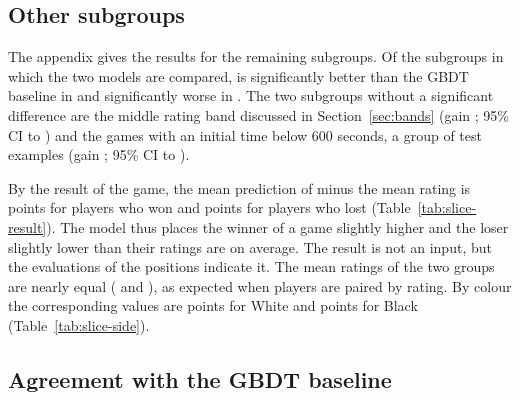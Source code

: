 \documentclass[11pt]{article}
\begin{document}
\begin{table}[htbp]\centering\footnotesize
{}
\caption{Test-set results by the number of the player's moves in the
sequence. A sequence is truncated after  moves, so the
last group contains the sequences of exactly that length. For each group: the
number of test examples, the mean rating, the mean prediction and MAE of each
of the two models, and the paired gain of the first model over the second.}
\label{tab:moves}
\end{table}

\subsection{Other subgroups}

The appendix gives the results for the remaining subgroups. Of the
 subgroups in which the two models are compared,
 is significantly better than the GBDT baseline in
 and significantly worse in . The two
subgroups without a significant difference are the middle rating band
 discussed in Section~\ref{sec:bands} (gain
; 95\% CI  to
) and the games with an initial time below
600 seconds, a group of  test examples (gain
; 95\% CI  to
).

By the result of the game, the mean prediction of  minus
the mean rating is  points for players who
won and  points for players who lost
(Table~\ref{tab:slice-result}). The model thus places the winner of a game
slightly higher and the loser slightly lower than their ratings are on
average. The result is not an input, but the evaluations of the positions
indicate it. The mean ratings of the two groups are nearly equal
( and ), as
expected when players are paired by rating. By colour the corresponding
values are  points for White and
 points for Black
(Table~\ref{tab:slice-side}).

\subsection{Agreement with the GBDT baseline}
\end{document}

